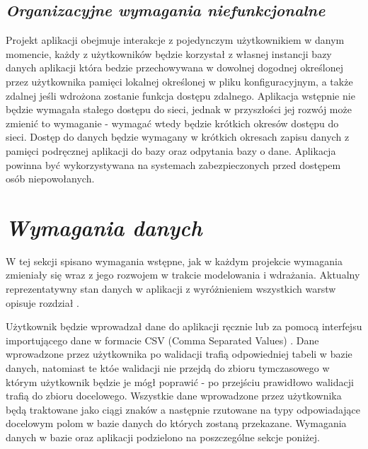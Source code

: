 \documentclass[a4paper,10pt, twoside]{report}
\newcommand{\customstylechapter}[1]{\large{\textit{#1}}}
\newcommand{\customstylesection}[1]{\textbf{\textit{#1}}}
\begin{document}


\section{\customstylesection{Organizacyjne wymagania niefunkcjonalne}}
{Projekt aplikacji obejmuje interakcje z pojedynczym użytkownikiem w danym 
momencie, każdy z użytkowników będzie korzystał z własnej instancji bazy 
danych aplikacji która bedzie przechowywana w dowolnej dogodnej określonej 
przez użytkownika pamięci lokalnej określonej w pliku konfiguracyjnym, a także 
zdalnej jeśli wdrożona zostanie funkcja dostępu zdalnego. Aplikacja 
wstępnie nie będzie wymagała stałego dostępu do sieci, jednak w przyszłości 
jej rozwój może zmienić to wymaganie - wymagać wtedy będzie krótkich okresów 
dostępu do sieci. Dostęp do danych będzie wymagany w krótkich okresach zapisu 
danych z pamięci podręcznej aplikacji do bazy oraz odpytania bazy o dane. 
Aplikacja powinna być wykorzystywana na systemach zabezpieczonych przed dostępem
 osób niepowołanych.}

\chapter{\customstylechapter{Wymagania danych}}
{W tej sekcji spisano wymagania wstępne, jak w każdym projekcie wymagania 
zmieniały się wraz z jego rozwojem w trakcie modelowania i 
wdrażania. Aktualny reprezentatywny stan danych w aplikacji z wyróżnieniem 
wszystkich warstw opisuje rozdział .}

{Użytkownik będzie wprowadzał dane do aplikacji ręcznie lub za pomocą interfejsu
importującego dane w formacie CSV (Comma Separated Values) \cite{CSV}. Dane 
wprowadzone przez użytkownika po walidacji trafią odpowiedniej tabeli w bazie 
danych, natomiast te któe walidacji nie przejdą do zbioru tymczasowego w którym 
użytkownik będzie je mógł poprawić - po przejściu prawidłowo walidacji trafią 
do zbioru docelowego. Wszystkie dane wprowadzone przez użytkownika będą 
traktowane jako ciągi znaków a następnie rzutowane na typy odpowiadające 
docelowym polom w bazie danych do których zostaną przekazane. Wymagania 
danych w bazie oraz aplikacji podzielono na poszczególne sekcje poniżej.}
\end{document}
